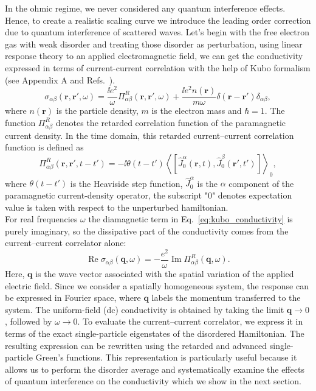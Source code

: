 In the ohmic regime, we never considered any quantum interference effects. Hence, to create a realistic scaling curve we introduce the leading order correction due to quantum interference of scattered waves. Let's begin with the free electron gas with weak disorder and treating those disorder as perturbation, using linear response theory to an applied electromagnetic field, we can get the conductivity expressed in terms of current-current correlation with the help of Kubo formalism (see Appendix A and Refs.~\cite{BruusFlensberg,Coleman2015}).
\begin{equation}
    \sigma_{\alpha\beta}
    (\mathbf r,\mathbf r',\omega)
    =
    \frac{\ii e^2}{\omega}
    \Pi_{\alpha\beta}^{R}
    (\mathbf r,\mathbf r',\omega)
    +
    \frac{\ii e^2 n(\mathbf r)}{m\omega}
    \delta(\mathbf r-\mathbf r')
    \delta_{\alpha\beta},
    \label{eq:kubo_conductivity}
\end{equation}
where $n(\mathbf r)$ is the particle density, $m$ is the electron
mass and $\hbar=1$. The function
$\Pi_{\alpha\beta}^{R}$ denotes the retarded correlation function
of the paramagnetic current density. In the time domain, this retarded current--current correlation
function is defined as
\begin{equation}
    \Pi_{\alpha\beta}^{R}
    (\mathbf r,\mathbf r',t-t')
    =
    -\ii\theta(t-t')
    \left\langle
    \left[
        \hat J_0^\alpha(\mathbf r,t),
        \hat J_0^\beta(\mathbf r',t')
    \right]
    \right\rangle_0,
    \label{eq:retarded_current_correlation}
\end{equation}
where $\theta(t-t')$ is the Heaviside step function,
$\hat J_0^\alpha$ is the $\alpha$ component of the paramagnetic current-density operator, the subscript "$0$" denotes expectation value is taken with respect to the unperturbed hamiltonian.\\ 
For real frequencies $\omega$ the diamagnetic term in Eq.~\eqref{eq:kubo_conductivity} is purely imaginary, so the dissipative part of the conductivity comes from the current--current correlator alone:
\begin{equation}
    \operatorname{Re}\sigma_{\alpha\beta}(\mathbf q,\omega)
    = -\frac{e^2}{\omega}\operatorname{Im}\Pi^{R}_{\alpha\beta}(\mathbf q,\omega).
\end{equation}
Here, $\mathbf q$ is the wave vector associated with the spatial variation of the applied electric field. Since we consider a spatially homogeneous system, the response can be expressed in Fourier space, where $\mathbf q$ labels the momentum transferred to the system. The uniform-field (dc) conductivity is obtained by taking the limit $\mathbf q\to 0$, followed by $\omega\to 0$.
To evaluate the
current--current correlator, we express it in terms of the exact
single-particle eigenstates of the disordered Hamiltonian. The
resulting expression can be rewritten using the retarded and
advanced single-particle Green's functions. This representation is
particularly useful because it allows us to perform the disorder
average and systematically examine the effects of quantum
interference on the conductivity which we show in the next section.
